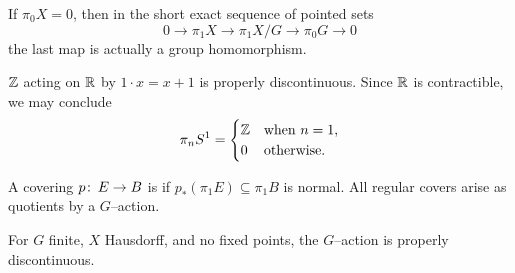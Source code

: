 \begin{remark}
If $\pi_0 X = 0$, then in the short exact sequence of pointed sets \[0 \to \pi_1 X \to \pi_1 X/G \to \pi_0 G \to 0\] the last map is actually a group homomorphism.
\end{remark}

\begin{example}\label{Pi1S1Calculation}
$\mathbb Z$ acting on $\mathbb R$ by $1 \cdot x = x+1$ is properly discontinuous.
Since $\mathbb R$ is contractible, we may conclude \[\pi_n S^1 = \begin{cases} \mathbb Z & \text{when $n = 1$}, \\ 0 & \text{otherwise}. \end{cases}\]
\end{example}

\begin{remark}
A covering $p\colon\thinspace E \to B$ is  if $p_*(\pi_1 E) \subseteq \pi_1 B$ is normal.
All regular covers arise as quotients by a $G$--action.
\end{remark}

\begin{remark}
For $G$ finite, $X$ Hausdorff, and no fixed points, the $G$--action is properly discontinuous.
\end{remark}





